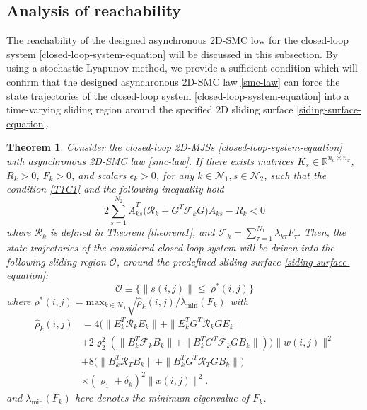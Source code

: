\documentclass[conference]{IEEEtran}
\newtheorem{theorem}{Theorem}
\begin{document}
\subsection{Analysis of reachability}\label{minimization} 
	 The reachability of the  designed asynchronous 2D-SMC low for the closed-loop system \eqref{closed-loop-system-equation} will be discussed in this subsection. By using a stochastic Lyapunov method, we provide a sufficient condition which will confirm that the designed asynchronous 2D-SMC law \eqref{smc-law} can force the state trajectories of the closed-loop system \eqref{closed-loop-system-equation} into a time-varying sliding region around the specified 2D sliding surface \eqref{siding-surface-equation}.
	 

\begin{theorem}\label{theorem2}	
	Consider the closed-loop 2D-MJSs \eqref{closed-loop-system-equation} with asynchronous 2D-SMC law \eqref{smc-law}. If there exists matrices $K_{s}\in\mathbb{R}^{n_u\times n_x}$, $R_{k}>0$, $F_{k}>0$, and  scalars $\epsilon_{k}>0$, for any $k\in\mathcal{N}_{1}, s\in\mathcal{N}_{2}$, such that the condition \eqref{T1C1} and the following inequality hold
	\begin{equation} \label{T2C1}
		2\sum_{s=1}^{N_{2}} \bar{A}^{T}_{ks}\big(\mathcal{R}_{k}+G^{T}\mathcal{F}_{k}G\big)\bar{A}_{ks}-R_{k} <0
	\end{equation}
	where $\mathcal{R}_{k}$ is defined in Theorem \ref{theorem1}, and $\mathcal{F}_{k}=\sum_{\tau=1}^{N_{1}}\lambda_{k\tau}F_{\tau}$. Then, the state trajectories of the considered closed-loop system will be driven into the following sliding region $\mathcal{O}$, around the predefined sliding surface \eqref{siding-surface-equation}:
	\begin{equation}\label{smc-region}
		\mathcal{O}\equiv\Big\{\|s(i,j)\|\leq\ \rho^{*}(i,j) \Big\}
	\end{equation} 
	where $\rho^{*}(i,j) = \mathrm{max}_{k\in\mathcal{N}_{1}}\sqrt{\hat{\rho}_{k}(i,j)/
	\lambda_{\mathrm{min}}(F_{k})}$ with
	\begin{equation*}
		 \begin{split}
		 	\hat{\rho}_{k}(i,j)&=4\big(\|E^{T}_{k}\mathcal{R}_{k}E_{k}\|+ \|E^{T}_{k}G^{T}\mathcal{R}_{k}GE_{k}\|\\
		 	&+2\varrho_{2}^{2}(\|B^{T}_{k}\mathcal{F}_{k}B_{k}\|+ \|B^{T}_{k}G^{T}\mathcal{F}_{k}GB_{k}\| )\big)\|w(i,j)\|^{2}\\
		 	&+8\big(\|B^{T}_{k}\mathcal{R}_{T}B_{k}\|+\|B^{T}_{k}G^{T}\mathcal{R}_{T}GB_{k}\|\big)\\ &\times(\varrho_{1}+\delta_{k})^{2}\|x(i,j)\|^{2}.
		 \end{split}
	\end{equation*}
	and $\lambda_{\mathrm{min}}(F_{k})$ here denotes the minimum eigenvalue of $F_{k}$.
\end{theorem} 
\end{document}

